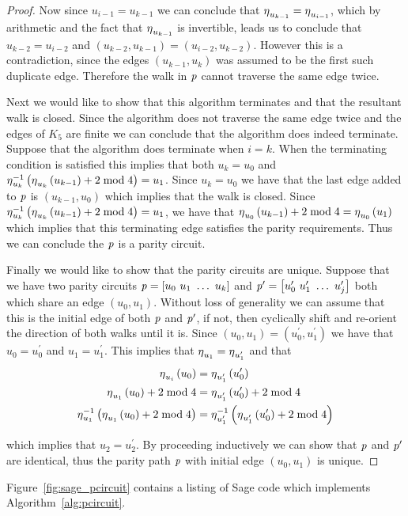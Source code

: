 \begin{proof}
\noindent
Now since $u_{i-1} = u_{k-1}$ we can conclude that  $\operatorname{\eta}_{u_{k-1}} = \operatorname{\eta}_{u_{i-1}}$, which by arithmetic and the fact that $\operatorname{\eta}_{u_{k-1}}$ is invertible, leads us to conclude that $u_{k-2} = u_{i-2}$ and $\left(u_{k-2}, u_{k-1} \right) = \left(u_{i-2}, u_{k-2}\right)$. However this is a contradiction, since the edges $\left(u_{k-1}, u_{k} \right)$ was assumed to be the first such duplicate edge. Therefore the walk in $\operatorname{\mathit{p}}$ cannot traverse the same edge twice. 

Next we would like to show that this algorithm terminates and that the resultant walk is closed. Since the algorithm does not traverse the same edge twice and the edges of $K_5$ are finite we can conclude that the algorithm does indeed terminate. Suppose that the algorithm does terminate when $i=k$. When the terminating condition is satisfied this implies that both $u_{k} = u_{0}$ and $\operatorname{\eta}_{u_k}^{-1}\left( \operatorname{\eta}_{u_{k}}\left(u_{k-1}\right) + 2 \bmod{4}\right) = u_{1}$. Since $u_{k} = u_{0}$ we have that the last edge added to $\operatorname{\mathit{p}}$ is $\left(u_{k-1}, u_0 \right)$ which implies that the walk is closed. Since $\operatorname{\eta}_{u_k}^{-1}\left( \operatorname{\eta}_{u_{k}}\left(u_{k-1}\right) + 2 \bmod{4}\right) = u_{1}$, we have that $\operatorname{\eta}_{u_{0}}\left(u_{k-1}\right) + 2 \bmod{4} = \operatorname{\eta}_{u_0}\left(u_{1} \right)$ which implies that this terminating edge satisfies the parity requirements. Thus we can conclude the $\operatorname{\mathit{p}}$ is a parity circuit.

Finally we would like to show that the parity circuits are unique. Suppose that we have two parity circuits $\operatorname{\mathit{p}} = \left[u_0\ u_1\ \ldots\ u_{k} \right]$ and $\operatorname{\mathit{p}}^{\prime} = \left[ u^{\prime}_0\  u^{\prime}_1\ \ldots\  u^{\prime}_j    \right]$ both which share an edge $\left( u_0,u_1  \right)$. Without loss of generality we can assume that this is the initial edge of both $\operatorname{\mathit{p}}$ and $\operatorname{\mathit{p}}^{\prime}$, if not, then cyclically shift and re-orient the direction of both walks until it is. Since $\left(u_0, u_1 \right) = \left( u^{\prime}_0, u^{\prime}_1 \right)$ we have that $u_0 = u^{\prime}_{0}$ and $u_1 = u^{\prime}_1$. This implies that $\operatorname{\eta}_{u_1} = \operatorname{\eta}_{u^{\prime}_1}$ and that 
\begin{align*}
  \operatorname{\eta}_{u_i}\left( u_0  \right) &= \operatorname{\eta}_{u^{\prime}_{1}}\left( u^{\prime}_0 \right) \\
  \operatorname{\eta}_{u_1}\left( u_0  \right) +2 \bmod{4} &= \operatorname{\eta}_{u^{\prime}_{1}}\left( u^{\prime}_0 \right) + 2 \bmod{4} \\
   \operatorname{\eta}^{-1}_{u_1} \left( \operatorname{\eta}_{u_1}\left( u_0  \right) +2 \bmod{4} \right) &=  \operatorname{\eta}^{-1}_{u^{\prime}_1} \left(\operatorname{\eta}_{u^{\prime}_{1}}\left( u^{\prime}_0 \right) + 2 \bmod{4}\right)
\end{align*}

\noindent
which implies that $u_2 = u^{\prime}_2$. By proceeding inductively we can show that $\operatorname{\mathit{p}}$ and $\operatorname{\mathit{p}}^{\prime}$ are identical, thus the parity path $\operatorname{\mathit{p}}$ with initial edge $\left(u_0, u_1 \right)$ is unique. 
\end{proof}
\noindent
Figure~\ref{fig:sage_pcircuit} contains a listing of Sage code which implements Algorithm~\ref{alg:pcircuit}. 
\noindent 


